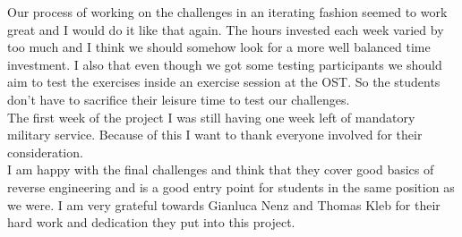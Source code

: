 Our process of working on the challenges in an iterating fashion seemed to work great and I would do it like that again. The hours invested each week varied by too much and I think we should somehow look for a more well balanced time investment. I also that even though we got some testing participants we should aim to test the exercises inside an exercise session at the OST. So the students don't have to sacrifice their leisure time to test our challenges.\\
The first week of the project I was still having one week left of mandatory military service. Because of this I want to thank everyone involved for their consideration. \\
I am happy with the final challenges and think that they cover good basics of reverse engineering and is a good entry point for students in the same position as we were. I am very grateful towards Gianluca Nenz and Thomas Kleb for their hard work and dedication they put into this project. 
